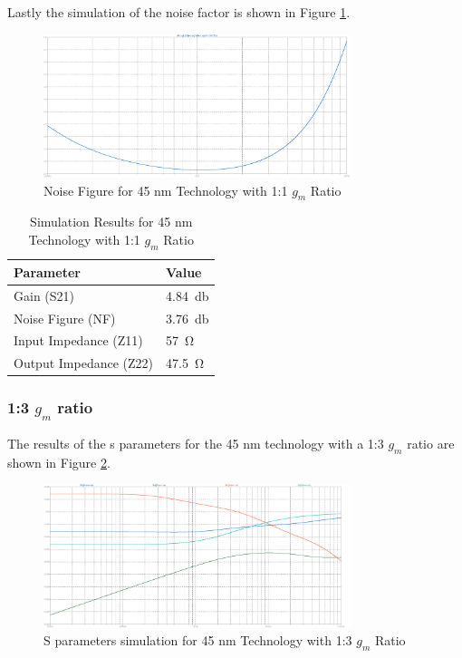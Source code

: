 Lastly the simulation of the noise factor is shown in Figure \ref{fig:Noise45nm1to1}.
\begin{figure}[H]
    \centering
    \includegraphics[width=0.8\textwidth]{Images/Noise_45_1To1.png}
    \caption{Noise Figure for 45 nm Technology with 1:1 $g_m$ Ratio}
    \label{fig:Noise45nm1to1}
\end{figure}

\begin{table}[H]
    \centering
    \caption{Simulation Results for 45 nm Technology with 1:1 $g_m$ Ratio}
    \begin{tabularx}{\textwidth}{>{\centering\arraybackslash}X >{\centering\arraybackslash}X }
        \toprule
        \textbf{Parameter} & \textbf{Value}\\
        \midrule
        Gain (S21) & \SI{4.84}{\decibel} \\
        \midrule
        Noise Figure (NF) & \SI{3.76}{\decibel} \\
        \midrule
        Input Impedance (Z11) & \SI{57}{\ohm} \\
        \midrule
        Output Impedance (Z22) & \SI{47.5}{\ohm} \\
        \bottomrule
    \end{tabularx}
    \label{tab:45nm_1to1_results}
\end{table}
\subsubsection{1:3 $g_m$ ratio}

The results of the s parameters for the 45 nm technology with a 1:3 $g_m$ ratio are shown in Figure \ref{fig:SParam45nm1to3}. 
\begin{figure}[H]
    \centering
    \includegraphics[width=0.8\textwidth]{Images/SParam_45_1To3.png}
    \caption{S parameters simulation for 45 nm Technology with 1:3 $g_m$ Ratio}
    \label{fig:SParam45nm1to3}
\end{figure}

